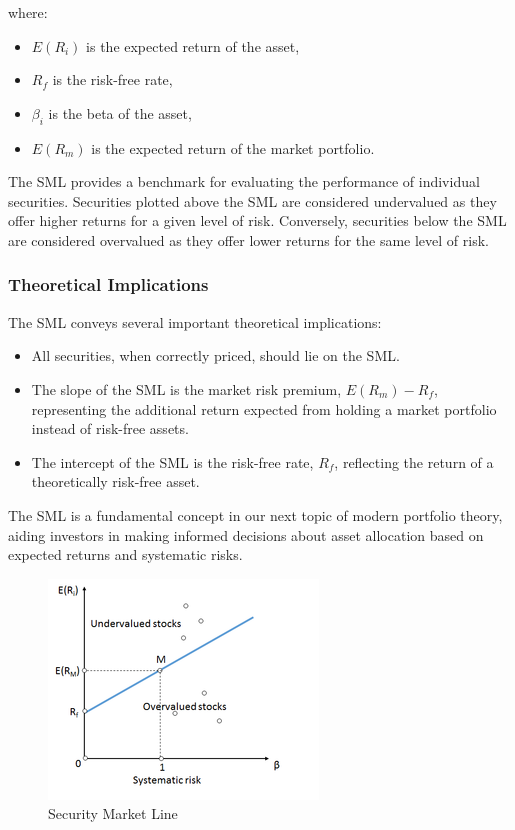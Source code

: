 where:
\begin{itemize}
    \item \( E(R_i) \) is the expected return of the asset,
    \item \( R_f \) is the risk-free rate,
    \item \( \beta_i \) is the beta of the asset,
    \item \( E(R_m) \) is the expected return of the market portfolio.
\end{itemize}

The SML provides a benchmark for evaluating the performance of individual securities. Securities plotted above the SML are considered undervalued as they offer higher returns for a given level of risk. Conversely, securities below the SML are considered overvalued as they offer lower returns for the same level of risk.

\subsubsection{Theoretical Implications}
The SML conveys several important theoretical implications:
\begin{itemize}
    \item All securities, when correctly priced, should lie on the SML.
    \item The slope of the SML is the market risk premium, \( E(R_m) - R_f \), representing the additional return expected from holding a market portfolio instead of risk-free assets.
    \item The intercept of the SML is the risk-free rate, \( R_f \), reflecting the return of a theoretically risk-free asset.
\end{itemize}

The SML is a fundamental concept in our next topic of modern portfolio theory, aiding investors in making informed decisions about asset allocation based on expected returns and systematic risks.

\begin{figure}[h]
\centering
\includegraphics[width=\linewidth]{SML.png} 
\caption{Security Market Line}
\label{fig:sml}
\end{figure}

